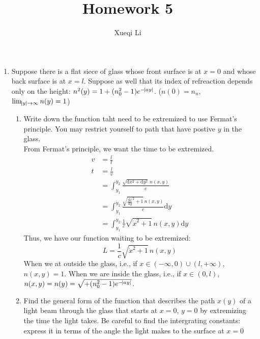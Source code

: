 \documentclass{article}
\newcommand{\de}{\mathrm{d}}
\begin{document}
\title{Homework 5}
\author{Xueqi Li}


\maketitle

\begin{enumerate}
    \item Suppose there is a flat siece of glass whose front surface is at $x = 0$ and whose back surface is at $x = l$. Suppose as well that its index of refreaction depends only on the height: $n^2(y) = 1+(n_0^2-1)e^{-\abs{ay}}$. ($n(0) = n_n$, $\lim_{\abs{y}\rightarrow\infty} n(y) = 1$)
    \begin{enumerate}
        \item Write down the function taht need to be extremized to use Fermat's principle. You may restrict yourself to path that have postive $y$ in the glass.\\

        From Fermat's principle, we want the time to be extremized.
        \begin{align*}
            v &= \frac{l}{t} \\
            t &= \frac{l}{v} \\
              &= \int_{y_1}^{y_2} \frac{\sqrt{\de x^2 + \de y^2}\,n(x,y)}{c} \\
              &= \int_{y_1}^{y_2} \frac{\sqrt{\frac{\de x}{\de y}^2 + 1}\,n(x,y)}{c} \de y \\
              &= \int_{y_1}^{y_2} \frac{1}{c}\sqrt{\dot x^2 + 1}\,n(x,y) \de y
        \end{align*}
        Thus, we have our function waiting to be extremized:
        \[
            L = \frac{1}{c}\sqrt{\dot x^2 + 1}\,n(x,y)
        \]
        When we at outside the glass, i.e., if $x \in (-\infty, 0) \cup (l,+\infty)$, $n(x,y) = 1$. When we are inside the glass, i.e., if $x \in (0,l)$, $n(x,y) = n(y) = \sqrt{+(n_0^2-1)e^{-\abs{ay}}}$.

        \item Find the general form of the function that describes the path $x(y)$ of a light beam through the glass that starts at $x = 0$, $y = 0$ by extremizing the time the light takes. Be careful to find the intergrating constants: express it in terms of the angle the light makes to the surface at $x = 0$\\


\end{enumerate}
\end{enumerate}
\end{document}
